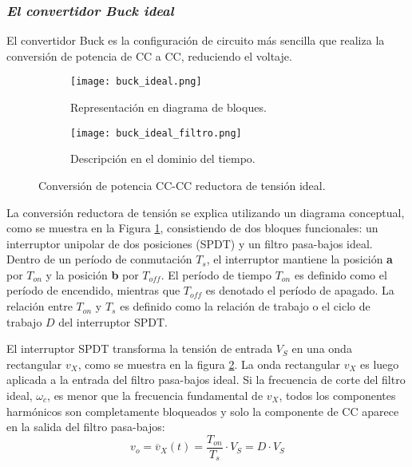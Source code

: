 \subsubsection*{\it{El convertidor Buck ideal}}
\vspace{-0.25cm}
El convertidor Buck es la configuración de circuito más sencilla que realiza la conversión de potencia de CC a CC, reduciendo el voltaje.

\begin{figure}[H]
    \centering

    \begin{subfigure}[b]{\textwidth}
        \centering
        \texttt{[image: buck\_ideal.png]}
        \vspace{-0.25cm}
        \caption{Representación en diagrama de bloques.}
        \label{fig:buck_ideal_diagrama}
    \end{subfigure}
    \begin{subfigure}[b]{\textwidth}
        \centering
        \texttt{[image: buck\_ideal\_filtro.png]}
        \vspace{-0.25cm}
        \caption{Descripción en el dominio del tiempo.}
        \label{fig:buck_ideal_filtro}
    \end{subfigure}

    \vspace{-0.25cm}
    \caption{Conversión de potencia CC-CC reductora de tensión ideal.}
    \label{fig:buck_ideal}
\end{figure}
\vspace{-0.5cm}

La conversión reductora de tensión se explica utilizando un diagrama conceptual, como se muestra en la Figura \ref{fig:buck_ideal_diagrama}, consistiendo
de dos bloques funcionales: un interruptor unipolar de dos posiciones (SPDT) y un filtro pasa-bajos ideal. Dentro de un período de conmutación $T_s$, el
interruptor mantiene la posición \textbf{a} por $T_{on}$ y la posición \textbf{b} por $T_{off}$. El período de tiempo $T_{on}$ es definido como el período de encendido,
mientras que $T_{off}$ es denotado el período de apagado. La relación entre $T_{on}$ y $T_s$ es definido como la relación de trabajo o el ciclo de trabajo $D$ del
interruptor SPDT.

El interruptor SPDT transforma la tensión de entrada $V_S$ en una onda rectangular $v_X$, como se muestra en la figura \ref{fig:buck_ideal_filtro}.
La onda rectangular $v_X$ es luego aplicada a la entrada del filtro pasa-bajos ideal. Si la frecuencia de corte del filtro ideal, $\omega_c$, es menor que la
frecuencia fundamental de $v_X$, todos los componentes harmónicos son completamente bloqueados y solo la componente de CC aparece en la salida del filtro pasa-bajos:
\begin{equation}
    v_{o} = {\overline{v}}_X(t) = \dfrac{T_{on}}{T_{s}} \cdot V_S = D \cdot V_S
    \label{eq:buck_ideal}
\end{equation}


